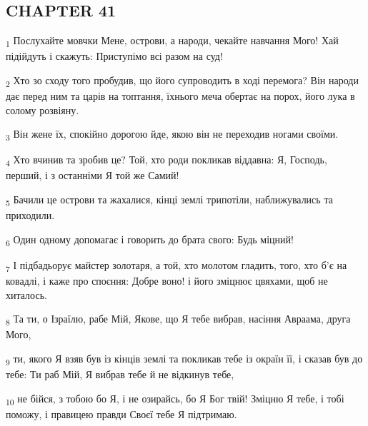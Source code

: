 \subsection{CHAPTER 41}
\begin{tcolorbox}
\textsubscript{1} Послухайте мовчки Мене, острови, а народи, чекайте навчання Мого! Хай підійдуть і скажуть: Приступімо всі разом на суд!
\end{tcolorbox}
\begin{tcolorbox}
\textsubscript{2} Хто зо сходу того пробудив, що його супроводить в ході перемога? Він народи дає перед ним та царів на топтання, їхнього меча обертає на порох, його лука в солому розвіяну.
\end{tcolorbox}
\begin{tcolorbox}
\textsubscript{3} Він жене їх, спокійно дорогою йде, якою він не переходив ногами своїми.
\end{tcolorbox}
\begin{tcolorbox}
\textsubscript{4} Хто вчинив та зробив це? Той, хто роди покликав віддавна: Я, Господь, перший, і з останніми Я той же Самий!
\end{tcolorbox}
\begin{tcolorbox}
\textsubscript{5} Бачили це острови та жахалися, кінці землі трипотіли, наближувались та приходили.
\end{tcolorbox}
\begin{tcolorbox}
\textsubscript{6} Один одному допомагає і говорить до брата свого: Будь міцний!
\end{tcolorbox}
\begin{tcolorbox}
\textsubscript{7} І підбадьорує майстер золотаря, а той, хто молотом гладить, того, хто б'є на ковадлі, і каже про споєння: Добре воно! і його зміцнює цвяхами, щоб не хиталось.
\end{tcolorbox}
\begin{tcolorbox}
\textsubscript{8} Та ти, о Ізраїлю, рабе Мій, Якове, що Я тебе вибрав, насіння Авраама, друга Мого,
\end{tcolorbox}
\begin{tcolorbox}
\textsubscript{9} ти, якого Я взяв був із кінців землі та покликав тебе із окраїн її, і сказав був до тебе: Ти раб Мій, Я вибрав тебе й не відкинув тебе,
\end{tcolorbox}
\begin{tcolorbox}
\textsubscript{10} не бійся, з тобою бо Я, і не озирайсь, бо Я Бог твій! Зміцню Я тебе, і тобі поможу, і правицею правди Своєї тебе Я підтримаю.
\end{tcolorbox}
